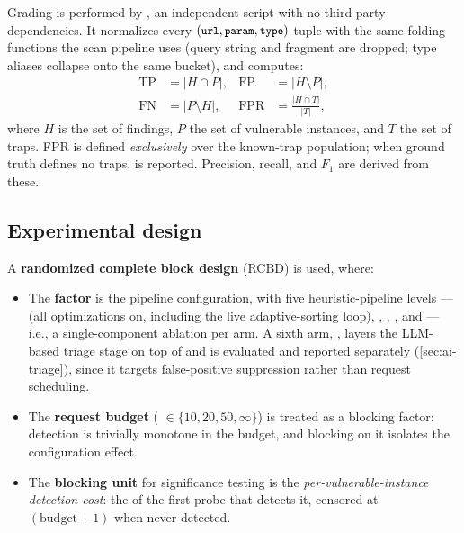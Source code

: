 Grading is performed by , an independent script
with no third-party dependencies. It normalizes every
$(\texttt{\small url}, \texttt{\small param}, \texttt{\small type})$ tuple with the same folding
functions the scan pipeline uses (query string and fragment are dropped; type
aliases collapse onto the same bucket), and computes:
\begin{align}
  \mathrm{TP} &= \lvert H \cap P \rvert, &
  \mathrm{FP} &= \lvert H \setminus P \rvert, \nonumber\\
  \mathrm{FN} &= \lvert P \setminus H \rvert, &
  \mathrm{FPR} &= \frac{\lvert H \cap T \rvert}{\lvert T \rvert},
  \label{eq:metricas}
\end{align}
where $H$ is the set of findings, $P$ the set of vulnerable instances, and $T$
the set of traps. FPR is defined \emph{exclusively} over the known-trap
population; when ground truth defines no traps,  is reported.
Precision, recall, and $F_1$ are derived from these.

\subsection{Experimental design}
\label{sec:diseno}

A \textbf{randomized complete block design} (RCBD) is used, where:

\begin{itemize}
  \item The \textbf{factor} is the pipeline configuration, with five
  heuristic-pipeline levels ---  (all optimizations on,
  including the live adaptive-sorting loop), ,
  , , and
   --- i.e., a single-component ablation per arm.
  A sixth arm, , layers the LLM-based triage stage on top of
   and is evaluated and reported separately
  (\cref{sec:ai-triage}), since it targets false-positive suppression rather
  than request scheduling.
  \item The \textbf{request budget}
  ( $\in \{10, 20, 50, \infty\}$) is treated as a
  blocking factor: detection is trivially monotone in the budget, and
  blocking on it isolates the configuration effect.
  \item The \textbf{blocking unit} for significance testing is the
  \emph{per-vulnerable-instance detection cost}: the  of
  the first probe that detects it, censored at $(\text{budget}+1)$ when never
  detected.
\end{itemize}


